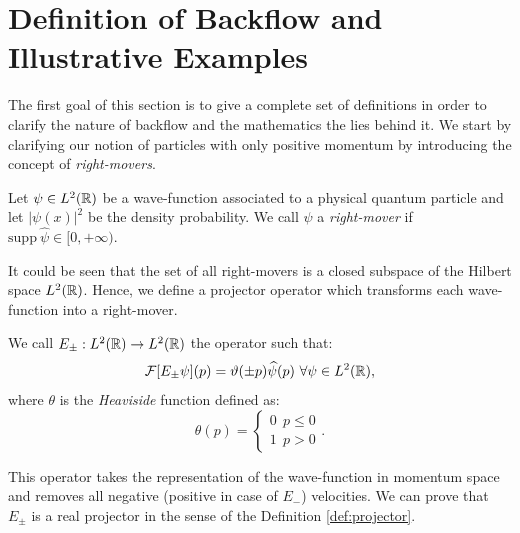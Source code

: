 \section{Definition of Backflow and Illustrative Examples}
\label{sec:examples1}

The first goal of this section is to give a complete set of definitions in order to clarify the nature of backflow and the mathematics the lies behind it. We start by clarifying our notion of particles with only positive momentum by introducing the concept of \textit{right-movers}.

\begin{definition}
	\label{def:right-mover}
	Let $\psi\in L^2({\mathbb R})$ be a wave-function associated to a physical quantum particle and let $|\psi(x)|^2$ be the density probability. We call $\psi$ a \textit{right-mover} if $\mathrm{supp}\ \hat{\psi}\in[0,+\infty)$.
\end{definition}

\begin{oss}
	It could be seen that the set of all right-movers is a closed subspace of the Hilbert space $L^2({\mathbb R})$. Hence, we define a projector operator which transforms each wave-function into a right-mover.
\end{oss}

\begin{definition}
	\label{def:projector_E+}
	We call $E_\pm:L^2({\mathbb R})\to L^2({\mathbb R})$ the operator such that:
	\begin{equation}
		\mathcal{F}[E_\pm\psi](p)=\vartheta(\pm p)\widehat{\psi}(p)\ \forall \psi\in L^2({\mathbb R}),
	\end{equation}
	where $\theta$ is the \textit{Heaviside} function defined as:
	\begin{equation}
		\theta(p)=\begin{cases}
		0\ \ p\le 0\\
		1\ \ p>0
		\end{cases}.
	\end{equation}
\end{definition}

\begin{oss}
	This operator takes the representation of the wave-function in momentum space and removes all negative (positive in case of $E_-$) velocities. We can prove that $E_\pm$ is a real projector in the sense of the Definition \ref{def:projector}.
\end{oss}

